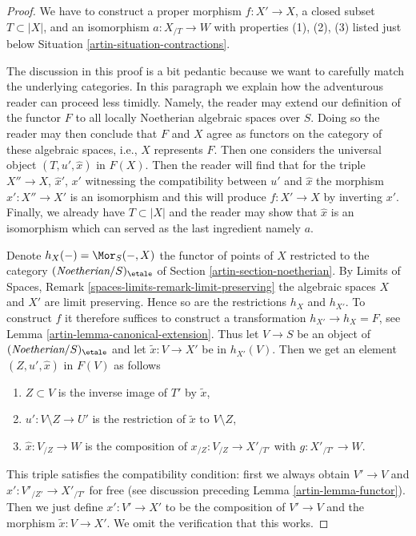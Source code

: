 \begin{proof}

We have to construct a proper morphism $f : X' \to X$, a closed subset
$T \subset |X|$, and an isomorphism $a : X_{/T} \to W$ with properties
(1), (2), (3) listed just below Situation \ref{artin-situation-contractions}.

\medskip\noindent
The discussion in this proof is a bit pedantic because we want
to carefully match the underlying categories. In this paragraph
we explain how the adventurous reader can proceed less timidly.
Namely, the reader may extend our definition of the functor $F$
to all locally Noetherian algebraic spaces over $S$.
Doing so the reader may then conclude that $F$ and $X$ agree as
functors on the category of these algebraic spaces, i.e.,
$X$ represents $F$. Then one considers the universal object
$(T, u', \hat x)$ in $F(X)$. Then the reader will find that
for the triple $X'' \to X$, $\hat x'$, $x'$ witnessing the compatibility
between $u'$ and $\hat x$ the morphism $x' : X'' \to X'$ is an isomorphism
and this will produce $f : X' \to X$ by inverting $x'$. Finally, we already
have $T \subset |X|$ and the reader may show that $\hat x$ is an isomorphism
which can served as the last ingredient namely $a$.

\medskip\noindent
Denote $h_X(-) = \Mor_S(-, X)$ the functor of
points of $X$ restricted to the category
$(\textit{Noetherian}/S)_\etale$ of Section \ref{artin-section-noetherian}.
By Limits of Spaces, Remark \ref{spaces-limits-remark-limit-preserving}
the algebraic spaces $X$ and $X'$ are limit preserving. Hence so
are the restrictions $h_X$ and $h_{X'}$.
To construct $f$ it therefore suffices to construct a
transformation $h_{X'} \to h_X = F$, see Lemma \ref{artin-lemma-canonical-extension}.
Thus let $V \to S$ be an object of $(\textit{Noetherian}/S)_\etale$
and let $\tilde x : V \to X'$ be in $h_{X'}(V)$.
Then we get an element $(Z, u', \hat x)$ in $F(V)$ as follows
\begin{enumerate}
\item $Z \subset V$ is the inverse image of $T'$ by $\tilde x$,
\item $u' : V \setminus Z \to U'$ is the restriction of
$\tilde x$ to $V \setminus Z$,
\item $\hat x : V_{/Z} \to W$ is the composition of
$x_{/Z} : V_{/Z} \to X'_{/T'}$ with $g : X'_{/T'} \to W$.
\end{enumerate}
This triple satisfies the compatibility condition: first we always
obtain $V' \to V$ and $\hat x' : V'_{/Z'} \to X'_{/T'}$ for free
(see discussion preceding Lemma \ref{artin-lemma-functor}).
Then we just define $x' : V' \to X'$ to be the composition
of $V' \to V$ and the morphism $\tilde x : V \to X'$.
We omit the verification that this works.


\end{proof}
